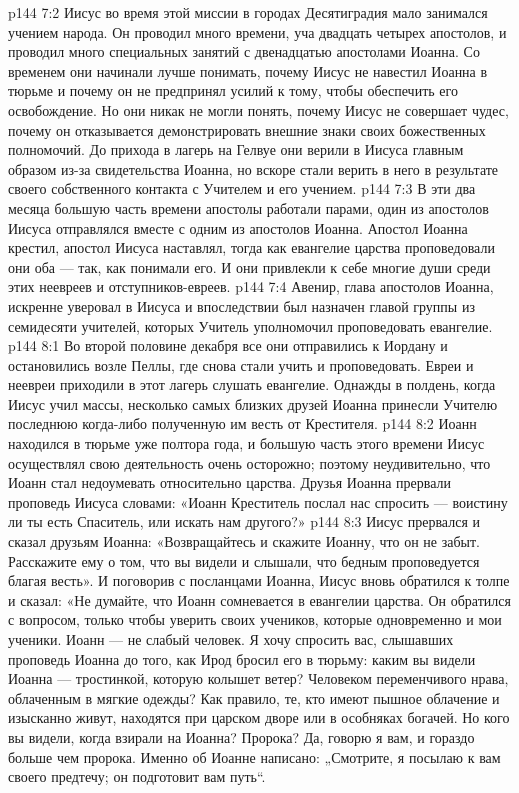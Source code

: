 \vs p144 7:2 Иисус во время этой миссии в городах Десятиградия мало занимался учением народа. Он проводил много времени, уча двадцать четырех апостолов, и проводил много специальных занятий с двенадцатью апостолами Иоанна. Со временем они начинали лучше понимать, почему Иисус не навестил Иоанна в тюрьме и почему он не предпринял усилий к тому, чтобы обеспечить его освобождение. Но они никак не могли понять, почему Иисус не совершает чудес, почему он отказывается демонстрировать внешние знаки своих божественных полномочий. До прихода в лагерь на Гелвуе они верили в Иисуса главным образом из\hyp{}за свидетельства Иоанна, но вскоре стали верить в него в результате своего собственного контакта с Учителем и его учением.
\vs p144 7:3 В эти два месяца большую часть времени апостолы работали парами, один из апостолов Иисуса отправлялся вместе с одним из апостолов Иоанна. Апостол Иоанна крестил, апостол Иисуса наставлял, тогда как евангелие царства проповедовали они оба --- так, как понимали его. И они привлекли к себе многие души среди этих неевреев и отступников\hyp{}евреев.
\vs p144 7:4 Авенир, глава апостолов Иоанна, искренне уверовал в Иисуса и впоследствии был назначен главой группы из семидесяти учителей, которых Учитель уполномочил проповедовать евангелие.
\vs p144 8:1 Во второй половине декабря все они отправились к Иордану и остановились возле Пеллы, где снова стали учить и проповедовать. Евреи и неевреи приходили в этот лагерь слушать евангелие. Однажды в полдень, когда Иисус учил массы, несколько самых близких друзей Иоанна принесли Учителю последнюю когда\hyp{}либо полученную им весть от Крестителя.
\vs p144 8:2 Иоанн находился в тюрьме уже полтора года, и большую часть этого времени Иисус осуществлял свою деятельность очень осторожно; поэтому неудивительно, что Иоанн стал недоумевать относительно царства. Друзья Иоанна прервали проповедь Иисуса словами: «Иоанн Креститель послал нас спросить --- воистину ли ты есть Спаситель, или искать нам другого?»
\vs p144 8:3 Иисус прервался и сказал друзьям Иоанна: «Возвращайтесь и скажите Иоанну, что он не забыт. Расскажите ему о том, что вы видели и слышали, что бедным проповедуется благая весть». И поговорив с посланцами Иоанна, Иисус вновь обратился к толпе и сказал: «Не думайте, что Иоанн сомневается в евангелии царства. Он обратился с вопросом, только чтобы уверить своих учеников, которые одновременно и мои ученики. Иоанн --- не слабый человек. Я хочу спросить вас, слышавших проповедь Иоанна до того, как Ирод бросил его в тюрьму: каким вы видели Иоанна --- тростинкой, которую колышет ветер? Человеком переменчивого нрава, облаченным в мягкие одежды? Как правило, те, кто имеют пышное облачение и изысканно живут, находятся при царском дворе или в особняках богачей. Но кого вы видели, когда взирали на Иоанна? Пророка? Да, говорю я вам, и гораздо больше чем пророка. Именно об Иоанне написано: „Смотрите, я посылаю к вам своего предтечу; он подготовит вам путь“.
